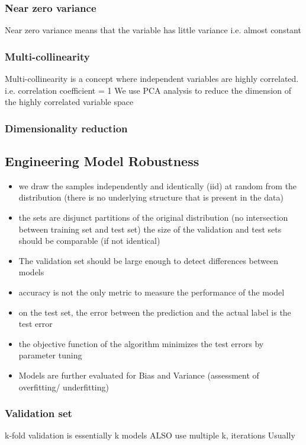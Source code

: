 \documentclass[12pt,a4paper]{article}
\begin{document}
\subsubsection{Near zero variance}
Near zero variance means that the variable has little variance i.e. almost constant
\subsubsection{Multi-collinearity}
Multi-collinearity is a concept where independent variables are highly correlated. i.e. correlation coefficient = 1
We use PCA analysis to reduce the dimension of the highly correlated variable space 
\subsubsection{Dimensionality reduction}

\subsection{Engineering Model Robustness}
\begin{itemize}
    \item we draw the samples independently and identically (iid) at random from the distribution
    (there is no underlying structure that is present in the data)
    \item the sets are disjunct partitions of the original distribution
    (no intersection between training set and test set)
    the size of the validation and test sets should be comparable (if not identical)
    \item The validation set should be large enough to detect differences between models
    \item accuracy is not the only metric to measure the performance of the model
    \item  on the test set, the error between the prediction and the actual label is the test error
    \item the objective function of the algorithm minimizes the test errors by parameter tuning
    \item Models are further evaluated for Bias and Variance (assessment of overfitting/ underfitting)
\end{itemize}
\subsubsection{Validation set}
k-fold validation is essentially k models
ALSO use multiple k, iterations
Usually 
\end{document}
